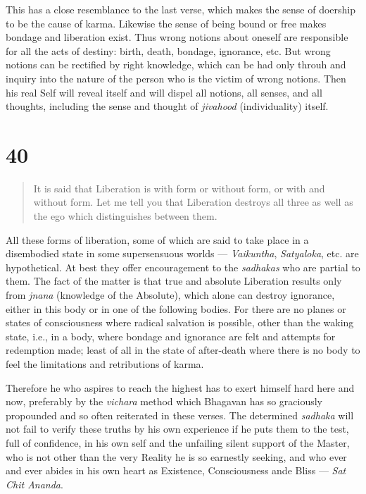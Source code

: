 \documentclass[12pt]{report}
\begin{document}

This has a close resemblance to the last verse, which makes the sense
of doership to be the cause of karma. Likewise the sense of being
bound or free makes bondage and liberation exist. Thus wrong notions
about oneself are responsible for all the acts of destiny: birth,
death, bondage, ignorance, etc. But wrong notions can be rectified by
right knowledge, which can be had only throuh and inquiry into the
nature of the person who is the victim of wrong notions. Then his real
Self will reveal itself and will dispel all notions, all senses, and
all thoughts, including the sense and thought of \emph{jivahood}
(individuality) itself.

\section{40}

\begin{quote}
  It is said that Liberation is with form or without form, or with and
  without form. Let me tell you that Liberation destroys all three as
  well as the ego which distinguishes between them.
\end{quote}


All these forms of liberation, some of which are said to take place in
a disembodied state in some supersensuous worlds --- \emph{Vaikuntha},
\emph{Satyaloka}, etc. are hypothetical. At best they offer
encouragement to the \emph{sadhakas} who are partial to them. The fact
of the matter is that true and absolute Liberation results only from
\emph{jnana} (knowledge of the Absolute), which alone can destroy
ignorance, either in this body or in one of the following bodies. For
there are no planes or states of consciousness where radical salvation
is possible, other than the waking state, i.e., in a body, where
bondage and ignorance are felt and attempts for redemption made; least
of all in the state of after-death where there is no body to feel the
limitations and retributions of karma.

Therefore he who aspires to reach the highest has to exert himself
hard here and now, preferably by the \emph{vichara} method which
Bhagavan has so graciously propounded and so often reiterated in these
verses. The determined \emph{sadhaka} will not fail to verify these
truths by his own experience if he puts them to the test, full of
confidence, in his own self and the unfailing silent support of the
Master, who is not other than the very Reality he is so earnestly
seeking, and who ever and ever abides in his own heart as Existence,
Consciousness ande Bliss --- \emph{Sat Chit Ananda}.
\end{document}
